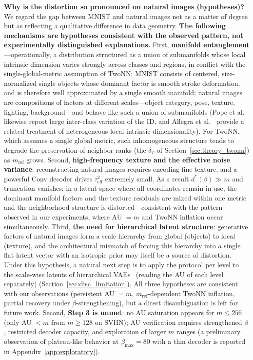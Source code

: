 \documentclass[make,article,submit,pdftex,moreauthors]{Definitions/mdpi}
\newcommand{\dstar}{d^{*}(\beta)}
\begin{document}
\textbf{Why is the distortion so pronounced on natural images
(hypotheses)?}
We regard the gap between MNIST and natural images not as a matter of
degree but as reflecting a qualitative difference in data geometry.
\textbf{The following mechanisms are hypotheses consistent with the
observed pattern, not experimentally distinguished explanations.}
First, \textbf{manifold entanglement}---operationally, a distribution
structured as a union of submanifolds whose local intrinsic dimension
varies strongly across classes and regions, in conflict with the
single-global-metric assumption of TwoNN: MNIST consists of centered,
size-normalized single objects whose dominant factor is smooth stroke
deformation, and is therefore well approximated by a single smooth
manifold; natural images are compositions of factors at different
scales---object category, pose, texture, lighting, background---and behave
like such a union of submanifolds (Pope et
al.~\cite{pope2021intrinsic} likewise report large inter-class variation
of the ID, and Allegra et al.~\cite{allegra2020data} provide a related
treatment of heterogeneous local intrinsic dimensionality).
For TwoNN, which assumes a single global metric, such inhomogeneous
structure tends to degrade the preservation of neighbor ranks (the
$\delta_T$ of Section~\ref{sec:theory_twonn}) as $m_{\mathrm{ref}}$
grows.
Second, \textbf{high-frequency texture and the effective noise variance}:
reconstructing natural images requires encoding fine texture, and a
powerful Conv decoder drives $\tau^2_{\mathrm{eff}}$ extremely small.
As a result $\dstar \gg m$ and truncation vanishes; in a latent space where
all coordinates remain in use, the dominant manifold factors and the
texture residuals are mixed within one metric and the neighborhood
structure is distorted---consistent with the pattern observed in our
experiments, where AU $= m$ and TwoNN inflation occur simultaneously.
Third, \textbf{the need for hierarchical latent structure}: generative
factors of natural images form a scale hierarchy from global (objects) to
local (texture), and the architectural mismatch of forcing this hierarchy
into a single flat latent vector with an isotropic prior may itself be a
source of distortion.
Under this hypothesis, a natural next step is to apply the protocol
per level to the scale-wise latents of hierarchical
VAEs~\cite{sonderby2016ladder} (reading the AU of each level separately)
(Section~\ref{sec:disc_limitation}).
All three hypotheses are consistent with our observations (persistent
AU $= m$, $m_{\mathrm{ref}}$-dependent TwoNN inflation, partial recovery
under $\beta$-strengthening), but a direct disambiguation is left for
future work.
Second, \textbf{Step 3 is unmet}: no AU saturation appears for
$m \leq 256$ (only AU $< m$ from $m \geq 128$ on SVHN); AU verification
requires strengthened $\beta$, restricted decoder capacity, and exploration
of larger $m$ ranges (a preliminary observation of plateau-like behavior at
$\beta_{\max} = 80$ with a thin decoder is reported in
Appendix~\ref{app:exploratory}).
\end{document}
